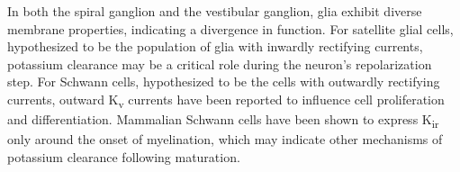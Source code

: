 { %
In both the spiral ganglion and the vestibular ganglion, glia exhibit diverse membrane properties, indicating a divergence in function. For satellite glial cells, hypothesized to be the population of glia with inwardly rectifying currents, potassium clearance may be a critical role during the neuron's repolarization step. For Schwann cells, hypothesized to be the cells with outwardly rectifying currents, outward K\textsubscript{v} currents have been reported to influence cell proliferation and differentiation. Mammalian Schwann cells have been shown to express K\textsubscript{ir} only around the onset of myelination, which may indicate other mechanisms of potassium clearance following maturation.
}
 \newpage
